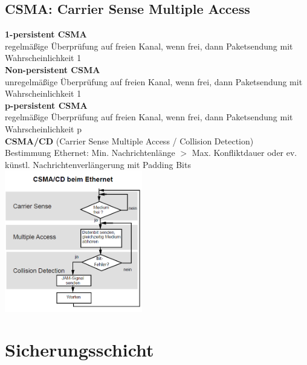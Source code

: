 \documentclass[fs, footer]{latex4ei}
\begin{document}
\begin{multicols*}{4}
{	\subsection{CSMA: Carrier Sense Multiple Access}
	
	
	\textbf{1-persistent CSMA}  \\
		regelmäßige Überprüfung auf freien Kanal, wenn frei, dann Paketsendung mit Wahrscheinlichkeit 1 \\
		
	\textbf{Non-persistent CSMA} \\
		unregelmäßige Überprüfung auf freien Kanal, wenn frei, dann Paketsendung mit Wahrscheinlichkeit 1 \\
	
	\textbf{p-persistent CSMA}  \\
		regelmäßige Überprüfung auf freien Kanal, wenn frei, dann Paketsendung mit Wahrscheinlichkeit p \\
		
	\textbf{CSMA/CD} (Carrier Sense Multiple Access / Collision Detection) \\
		Bestimmung Ethernet:  Min. Nachrichtenlänge $ > $  Max. Konfliktdauer oder ev. künstl. Nachrichtenverlängerung mit Padding Bits \\

	\includegraphics[width = 6cm]{./img/CSMA_CD.png}

}

\section{Sicherungsschicht}

\end{multicols*}
\end{document}
